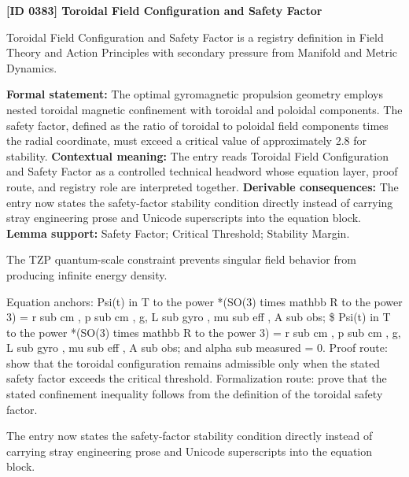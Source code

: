 \clearpage
\noindent\textbf{[ID 0383] Toroidal Field Configuration and Safety Factor}\par
\vspace{0.35em}
\begingroup\small
{}
Toroidal Field Configuration and Safety Factor is a registry definition in Field Theory and Action Principles with secondary pressure from Manifold and Metric Dynamics.

\begingroup\footnotesize\setlength{\emergencystretch}{3em}\sloppy
\textbf{Formal statement:} The optimal gyromagnetic propulsion geometry employs nested toroidal magnetic confinement with toroidal and poloidal components. The safety factor, defined as the ratio of toroidal to poloidal field components times the radial coordinate, must exceed a critical value of approximately 2.8 for stability. \textbf{Contextual meaning:} The entry reads Toroidal Field Configuration and Safety Factor as a controlled technical headword whose equation layer, proof route, and registry role are interpreted together. \textbf{Derivable consequences:} The entry now states the safety-factor stability condition directly instead of carrying stray engineering prose and Unicode superscripts into the equation block. \textbf{Lemma support:} Safety Factor; Critical Threshold; Stability Margin.\par
\endgroup

The TZP quantum-scale constraint prevents singular field behavior from producing infinite energy density.

Equation anchors: Psi(t) in T to the power *(SO(3) times mathbb R to the power 3) = r sub cm , p sub cm , g, L sub gyro , mu sub eff , A sub obs; \$ Psi(t) in T to the power *(SO(3) times mathbb R to the power 3) = r sub cm , p sub cm , g, L sub gyro , mu sub eff , A sub obs; and alpha sub measured = 0. Proof route: show that the toroidal configuration remains admissible only when the stated safety factor exceeds the critical threshold. Formalization route: prove that the stated confinement inequality follows from the definition of the toroidal safety factor.

The entry now states the safety-factor stability condition directly instead of carrying stray engineering prose and Unicode superscripts into the equation block.
\endgroup

